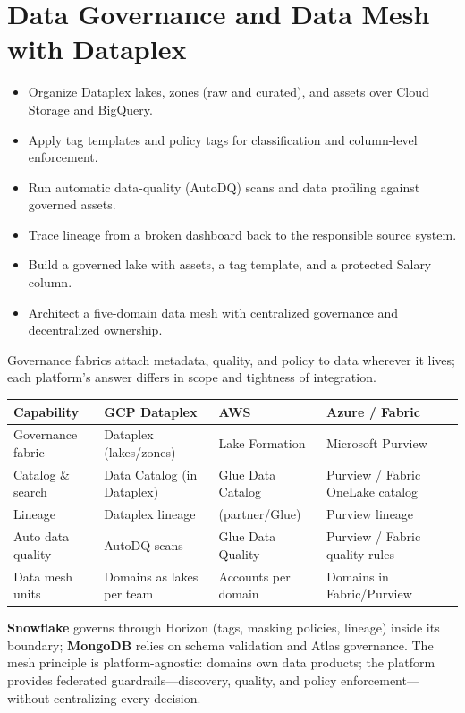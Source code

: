 \chapter{Data Governance and Data Mesh with Dataplex}

\begin{objectives}
\begin{itemize}
    \item Organize Dataplex lakes, zones (raw and curated), and assets over Cloud Storage and BigQuery.
    \item Apply tag templates and policy tags for classification and column-level enforcement.
    \item Run automatic data-quality (AutoDQ) scans and data profiling against governed assets.
    \item Trace lineage from a broken dashboard back to the responsible source system.
    \item Build a governed lake with assets, a tag template, and a protected Salary column.
    \item Architect a five-domain data mesh with centralized governance and decentralized ownership.
\end{itemize}
\end{objectives}

\begin{crosscloud}
Governance fabrics attach metadata, quality, and policy to data wherever it lives; each platform's answer differs in scope and tightness of integration.

\vspace{2mm}
{\footnotesize
\begin{tabular}{@{}p{2.8cm}p{3.0cm}p{3.0cm}p{3.0cm}@{}} \\
\toprule
\textbf{Capability} & \textbf{GCP Dataplex} & \textbf{AWS} & \textbf{Azure / Fabric} \\
\midrule
Governance fabric & Dataplex (lakes/zones) & Lake Formation & Microsoft Purview \\
Catalog \& search & Data Catalog (in Dataplex) & Glue Data Catalog & Purview / Fabric OneLake catalog \\
Lineage & Dataplex lineage & (partner/Glue) & Purview lineage \\
Auto data quality & AutoDQ scans & Glue Data Quality & Purview / Fabric quality rules \\
Data mesh units & Domains as lakes per team & Accounts per domain & Domains in Fabric/Purview \\
\bottomrule
\end{tabular}}

\vspace{1mm}
\textbf{Snowflake} governs through Horizon (tags, masking policies, lineage) inside its boundary; \textbf{MongoDB} relies on schema validation and Atlas governance. The mesh principle is platform-agnostic: domains own data products; the platform provides federated guardrails---discovery, quality, and policy enforcement---without centralizing every decision.
\end{crosscloud}

